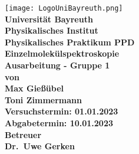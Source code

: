 \documentclass{article}               %
\begin{document}
  \setlength{\parindent}{0em}
    \begin{titlepage}
        \centering
        \texttt{[image: LogoUniBayreuth.png]}
        \vspace{0.5cm}
        {\large \textbf{\\Universität Bayreuth\\Physikalisches Institut\\Physikalisches Praktikum PPD}\\}
        \vspace{2.5cm}
        {\Huge \textbf{Einzelmolekülspektroskopie}\\}
        \vspace{2.5cm}
        {\LARGE \textbf{Ausarbeitung - Gruppe 1}\\}
        \vspace{0.5cm}
        {\large \textbf{von}\\}
        {\LARGE \textbf{Max Gießübel}\\}
        {\LARGE \textbf{Toni Zimmermann}\\} 	
        \vspace{2cm}
        {\large \textbf{Versuchstermin: 01.01.2023}\\}
        {\large \textbf{Abgabetermin: 10.01.2023}\\}
        \vspace{2cm}
        {\large \textbf{Betreuer\\}}
        {\LARGE \textbf{Dr.~Uwe Gerken\\}}
        \vfill
    \end{titlepage}
    
    \tableofcontents
    \newpage
    
    
    \newpage
    
    \newpage
    
    \newpage
    
    \newpage
    
    \newpage
    \printbibliography
\end{document}
